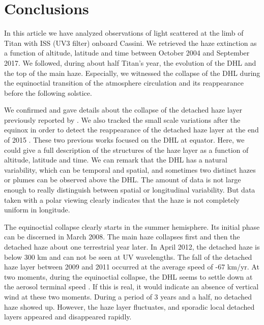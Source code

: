 \section{Conclusions}

In this article we have analyzed observations of light scattered at the limb of Titan with ISS (UV3 filter) onboard
Cassini. We retrieved the haze extinction as a function of altitude, latitude and time between October 2004 and
September 2017. We followed, during about half Titan's year, the evolution of the DHL and the top of the
main haze. Especially, we witnessed the collapse of the DHL during the equinoctial transition of the atmosphere
circulation and its reappearance before the following solstice.

We confirmed and gave details about the collapse of the detached haze layer previously reported by \cite{West2011}.
We also tracked the small scale variations after the equinox in order to detect the reappearance of the detached haze
layer at the end of 2015 \citep{West2018}. These two previous works focused on the DHL at equator. Here, we could give
a full description of the structures of the haze layer as a function of altitude, latitude and time. We can remark
that the DHL has a natural variability, which can be temporal and spatial, and sometimes two distinct hazes or plumes
can be observed above the DHL. The amount of data is not large enough to really distinguish between spatial or
longitudinal variability. But data taken with a polar viewing clearly indicates that the haze is not completely
uniform in longitude.

The equinoctial collapse clearly starts in the summer hemisphere. Its initial phase can be discerned in March
2008. The main haze collapses first and then the detached haze about one terrestrial year later. In April
2012, the detached haze is below 300 km and can not be seen at UV wavelengths.
The fall of the detached haze layer between 2009 and 2011 occurred at the average speed of -67 km/yr. At two moments,
during the equinoctial collapse, the DHL seems to settle down at the aerosol terminal speed
\citep[as reported by][]{West2018}. If this is real, it would indicate an absence of vertical wind at these two moments.
During a period of 3 years and a half, no detached haze showed up. However, the haze layer fluctuates, and sporadic
local detached layers appeared and disappeared rapidly.

